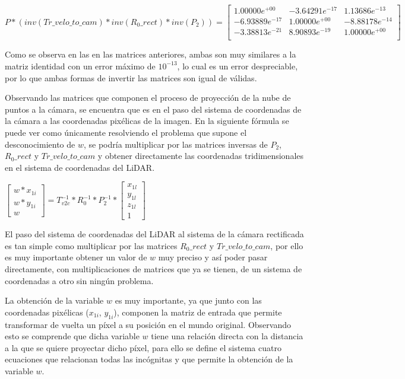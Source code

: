 \begin{center}
$
P * (inv(Tr\_velo\_to\_cam) * inv(R_0\_rect) * inv(P_2)) =
\begin{bmatrix}
1.00000e^{+00} & -3.64291e^{-17} & 1.13686e^{-13} \\
-6.93889e^{-17} & 1.00000e^{+00} & -8.88178e^{-14} \\
-3.38813e^{-21} & 8.90893e^{-19} & 1.00000e^{+00} \\
\end{bmatrix}
$
\end{center}

Como se observa en las en las matrices anteriores, ambas son muy similares a la matriz identidad con un error máximo de $10^{-13}$, lo cual es un error despreciable, por lo que ambas formas de invertir las matrices son igual de válidas.

Observando las matrices que componen el proceso de proyección de la nube de puntos a la cámara, se encuentra que es en el paso del sistema de coordenadas de la cámara a las coordenadas pixélicas de la imagen. En la siguiente fórmula se puede ver como únicamente resolviendo el problema que supone el desconocimiento de $w$, se podría multiplicar por las matrices inversas de $P_2$, $R_0\_rect$ y $Tr\_velo\_to\_cam$ y obtener directamente las coordenadas tridimensionales en el sistema de coordenadas del \ac{LiDAR}.

\begin{center}
$
\begin{bmatrix}
w * x_{1i}\\w * y_{1i}\\w
\end{bmatrix}
= T_{v2c}^{-1} * R_0^{-1} * P_2^{-1}*
\begin{bmatrix}
x_{1l}\\y_{1l}\\z_{1l}\\1
\end{bmatrix}
$
\end{center}

El paso del sistema de coordenadas del \ac{LiDAR} al sistema de la cámara rectificada es tan simple como multiplicar por las matrices $R_0\_rect$ y $Tr\_velo\_to\_cam$, por ello es muy importante obtener un valor de $w$ muy preciso y así poder pasar directamente, con multiplicaciones de matrices que ya se tienen, de un sistema de coordenadas a otro sin ningún problema.

La obtención de la variable $w$ es muy importante, ya que junto con las coordenadas pixélicas ($x_{1i}$, $y_{1i}$), componen la matriz de entrada que permite transformar de vuelta un píxel a su posición en el mundo original. Observando esto se comprende que dicha variable $w$ tiene una relación directa con la distancia a la que se quiere proyectar dicho píxel, para ello se define el sistema cuatro ecuaciones que relacionan todas las incógnitas y que permite la obtención de la variable $w$.


